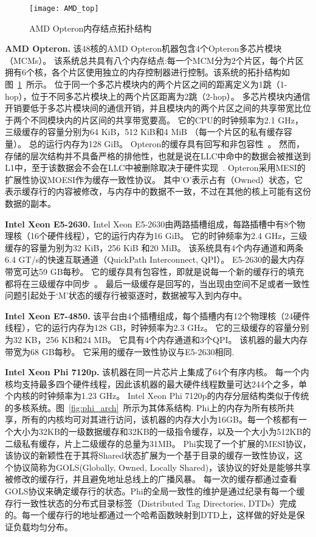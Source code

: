 \begin{figure}[htbp]
\centering
\texttt{[image: AMD\_top]}
\caption{AMD Opteron内存结点拓扑结构}\label{fig:AMD_top}
\end{figure}

\textbf{AMD Opteron.} 该48核的AMD Opteron机器包含4个Opteron多芯片模块（MCMs）。
该系统总共具有八个内存结点:每一个MCM分为2个片区，每个片区拥有6个核，各个片区使用独立的内存控制器进行控制。该系统的拓扑结构如图~\ref{fig:AMD_top}~所示。
位于同一个多芯片模块内的两个片区之间的距离定义为1跳（1-hop），位于不同多芯片模块上的两个片区距离为2跳（2-hop）。
多芯片模块内通信开销要低于多芯片模块间的通信开销，并且模块内的两个片区之间的共享带宽比位于两个不同模块内的片区间的共享带宽要高。
它的CPU的时钟频率为2.1 GHz，三级缓存的容量分别为64 KiB，512 KiB和4 MiB （每一个片区的私有缓存容量）。
总的运行内存为128 GiB。
Opteron的缓存具有回写和非包容性~\cite{Conway2010Cache}。
然而，存储的层次结构并不具备严格的排他性，也就是说在LLC中命中的数据会被推送到L1中，至于该数据会不会在LLC中被删除取决于硬件实现~\cite{2011Software}.
Opteron采用MESI的扩展性协议MOESI作为缓存一致性协议。
其中’O’表示占有（Owned）状态，它表示缓存行的内容被修改，与内存中的数据不一致，不过在其他的核上可能有这份数据的副本。

\textbf{Intel Xeon E5-2630.} Intel Xeon E5-2630由两路插槽组成，每路插槽中有8个物理核（16个硬件线程），它的运行内存为16 GiB。
它的时钟频率为2.4 GHz，三级缓存的容量为别为32 KiB，256 KiB 和20 MiB。
该系统具有4个内存通道和两条6.4 GT/s的快速互联通道（QuickPath Interconnect, QPI）。
E5-2630的最大内存带宽可达59 GB每秒。
它的缓存具有包容性，即就是说每一个新的缓存行的填充都将在三级缓存中同步~\cite{intel2016}。
最后一级缓存是回写的，当出现由空间不足或者一致性问题引起处于‘M’状态的缓存行被驱逐时，数据被写入到内存中。

\textbf{Intel Xeon E7-4850.} 该平台由4个插槽组成，每个插槽内有12个物理核（24硬件线程），它的运行内存为128 GB，时钟频率为2.3 GHz。
它的三级缓存的容量分别为32 KB，256 KB和24 MB。
它具有4个内存通道和3个QPI。
该机器的最大内存带宽为68 GB每秒。
它采用的缓存一致性协议与E5-2630相同.

\textbf{Intel Xeon Phi 7120p.} 该机器在同一片芯片上集成了64个有序内核。
每一个内核均支持最多四个硬件线程，因此该机器的最大硬件线程数量可达244个之多，单个内核的时钟频率为1.23 GHz。
Intel Xeon Phi 7120p的内存分层结构类似于传统的多核系统。图~\ref{fig:phi_arch}~所示为其体系结构.
Phi上的内存为所有核所共享，所有的内核均可对其进行访问，该机器的内存大小为16GB。每一个核都有一个大小为32KB的一级数据缓存和32KB的一级指令缓存，以及一个大小为512KB的二级私有缓存，片上二级缓存的总量为31MB。
Phi实现了一个扩展的MESI协议，该协议的新颖性在于其将Shared状态扩展为一个基于目录的缓存一致性协议，这个协议简称为GOLS(Globally, Owned, Locally Shared)，该协议的好处是能够共享被修改的缓存行，并且避免地址总线上的广播风暴。
每一次的缓存都通过查看GOLS协议来确定缓存行的状态。Phi的全局一致性的维护是通过纪录有每一个缓存行一致性状态的分布式目录标签（Distributed Tag Directories, DTDs）完成的。每一个缓存行的地址都通过一个哈希函数映射到DTD上，这样做的好处是保证负载均匀分布。

